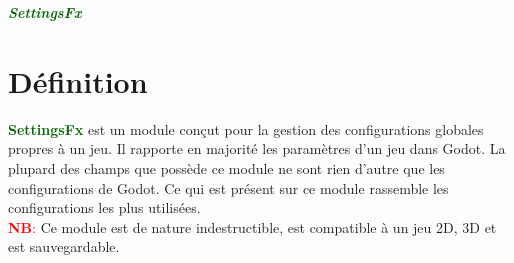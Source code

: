 \documentclass[a4paper, 11pt]{article}
\begin{document}
	\pagecolor{silver}
	\huge{\hspace{15cm}\textit{\textbf{\textcolor{darkgreen}{SettingsFx}}}}\large{} \tableofcontents 
	\newpage
	\section{Définition}
	\textcolor{darkgreen}{\textbf{SettingsFx}} est un module conçut pour la gestion des configurations 
	globales propres à un jeu. Il rapporte en majorité les paramètres d'un jeu dans Godot. La plupard des 
	champs que possède ce module ne sont rien d'autre que les configurations de Godot. Ce qui est présent 
	sur ce module rassemble les configurations les plus utilisées.\\
	\textcolor{red}{\textbf{NB}:} Ce module est de nature indestructible, est compatible à un jeu 2D, 3D et 
	est sauvegardable.

\end{document}
